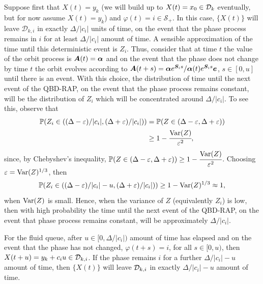 Suppose first that \(X(t)=y_k\) (we will build up to \(X(t)=x_0\in\mathcal{D}_k\) eventually, but for now assume \(X(t)=y_k\)) and \(\varphi(t)=i\in\mathcal S_+\). In this case, \(\{X(t)\}\) will leave \(\mathcal D_{k,i}\) in exactly \(\Delta/|c_i|\) units of time, on the event that the phase process remains in \(i\) for at least \(\Delta/|c_i|\) amount of time. A sensible approximation of the time until this deterministic event is \(Z_i\). Thus, consider that at time \(t\) the value of the orbit process is \(\boldsymbol A(t)=\boldsymbol \alpha\) and on the event that the phase does not change by time \(t\) the orbit evolves according to \(\boldsymbol A(t+s)=\boldsymbol \alpha e^{\boldsymbol S_is}/\boldsymbol \alpha (t)e^{\boldsymbol S_is}\boldsymbol e\), \(s\in[0,u]\) until there is an event. With this choice, the distribution of time until the next event of the QBD-RAP, on the event that the phase process remains constant, will be the distribution of \(Z_i\) which will be concentrated around \(\Delta/|c_i|\). To see this, observe that 
\begin{align*}
	\mathbb P(Z_i \in{}((\Delta-\varepsilon)/|c_i|, (\Delta+\varepsilon)/|c_i|) ) 
	&= \mathbb P(Z\in{}(\Delta-\varepsilon, \Delta + \varepsilon))
	\\&\geq 1-\cfrac{\mathrm{Var}(Z)}{\varepsilon^2},
\end{align*}
since, by Chebyshev's inequality, \(\mathbb P(Z\in{}(\Delta-\varepsilon, \Delta + \varepsilon)) \geq 1- \cfrac{\mathrm{Var}(Z)}{\varepsilon^2}\). Choosing \(\varepsilon = \mathrm{Var}(Z)^{1/3}\), then 
\[\mathbb P(Z_i \in{}((\Delta-\varepsilon)/|c_i|-u, (\Delta+\varepsilon)/|c_i|) )\geq 1-\mathrm{Var}(Z)^{1/3} \approx 1, \]
when \(\mathrm{Var}(Z)\) is small. Hence, when the variance of \(Z\) (equivalently \(Z_i\)) is low, then with high probability the time until the next event of the QBD-RAP, on the event that phase process remains constant, will be approximately \(\Delta/|c_i|\). 

For the fluid queue, after \(u\in{}[0,\Delta/|c_i|)\) amount of time has elapsed and on the event that the phase has not changed, \(\varphi(t+s)=i\), for all \(s\in{}[0,u)\), then \(X(t+u) = y_k + c_i u \in\mathcal{D}_{k,i}\). If the phase remains \(i\) for a further \(\Delta/|c_i|-u\) amount of time, then \(\{X(t)\}\) will leave \(\mathcal{D}_{k,i}\) in exactly \(\Delta/|c_i|-u\) amount of time. 

